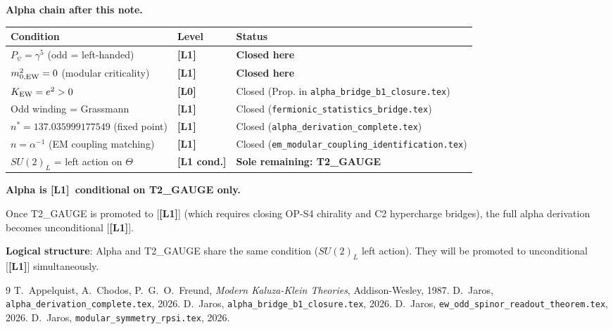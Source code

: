 \documentclass[12pt,a4paper]{article}
\theoremstyle{remark}\newtheorem{remark}[theorem]{Remark}
\newcommand{\Lz}{\textbf{[L0]}}
\newcommand{\Lo}{\textbf{[L1]}}
\newcommand{\Lc}{\textbf{[L1 cond.]}}
\begin{document}
\begin{resultbox}
\textbf{Alpha chain after this note.}

\begin{center}
\renewcommand{\arraystretch}{1.25}
\begin{tabular}{lll}
\toprule
Condition & Level & Status \\
\midrule
$P_\psi=\gamma^5$ (odd = left-handed) & \Lo & \textbf{Closed here} \\
$m^2_{0,\rm EW}=0$ (modular criticality) & \Lo & \textbf{Closed here} \\
$K_{\rm EW}=e^2>0$ & \Lz & Closed (Prop. in \texttt{alpha\_bridge\_b1\_closure.tex}) \\
Odd winding = Grassmann & \Lo & Closed (\texttt{fermionic\_statistics\_bridge.tex}) \\
$n^*=137.035999177549$ (fixed point) & \Lo & Closed (\texttt{alpha\_derivation\_complete.tex}) \\
$n=\alpha^{-1}$ (EM coupling matching) & \Lo\! & Closed (\texttt{em\_modular\_coupling\_identification.tex}) \\
\midrule
$SU(2)_L$ = left action on $\Theta$ & \Lc & \textbf{Sole remaining: T2\_GAUGE} \\
\bottomrule
\end{tabular}
\end{center}

\medskip
\textbf{Alpha is \Lo\ conditional on T2\_GAUGE only.}

Once T2\_GAUGE is promoted to [\Lo] (which requires closing OP-S4
chirality and C2 hypercharge bridges), the full alpha derivation
becomes unconditional [\Lo].

\medskip
\textbf{Logical structure}: Alpha and T2\_GAUGE share the same
condition ($SU(2)_L$ left action). They will be promoted to
unconditional [\Lo] simultaneously.
\end{resultbox}

\begin{thebibliography}{9}
  T.~Appelquist, A.~Chodos, P.~G.~O.~Freund,
  \textit{Modern Kaluza-Klein Theories}, Addison-Wesley, 1987.
  D.~Jaros, \texttt{alpha\_derivation\_complete.tex}, 2026.
  D.~Jaros, \texttt{alpha\_bridge\_b1\_closure.tex}, 2026.
  D.~Jaros, \texttt{ew\_odd\_spinor\_readout\_theorem.tex}, 2026.
  D.~Jaros, \texttt{modular\_symmetry\_rpsi.tex}, 2026.
\end{thebibliography}

\ifdefined\INCLUDEMODE\else
\end{document}
